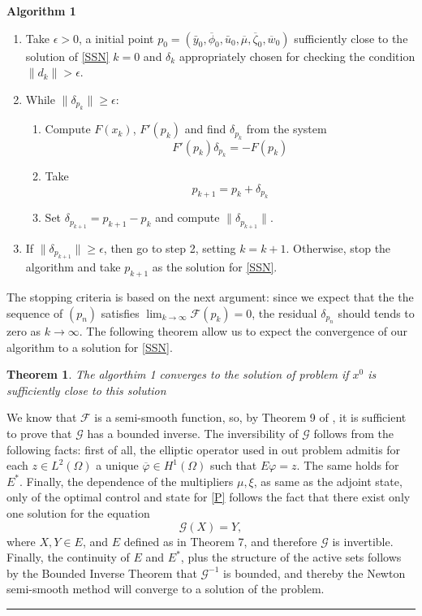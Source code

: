 \documentclass[11pt,a4paper]{amsart}
\newcommand{\kw}{\rule{2mm}{2mm}}
\newcommand{\om}{\Omega}
\renewenvironment{proof}{{Proof.}}{\hfill\kw}
\newtheorem{theorem}{{Theorem}}
\newcommand{\norm}[1]{\lVert #1 \rVert}
\begin{document}
\textbf{Algorithm 1}
\begin{enumerate}
    \item 
    Take $\epsilon>0$, a initial point $p_0=(\bar{y}_0,\overline{\phi}_0,\bar{u}_0,\overline{\mu},\overline{\zeta}_0,\overline{w}_0)$ sufficiently close to the solution of \eqref{SSN} $k=0$ and $\delta_{k}$ appropriately chosen for checking the condition $\norm{d_k}>\epsilon$.    
    \item
       While $\norm{\delta_{p_k}}\ge \epsilon$:
        \begin{enumerate}
            \item 
            Compute $F(x_k)$, $F'(p_k)$ and find $\delta_{p_{k}}$ from the system
            \[
                F'(p_k)\delta_{p_{k}}=-F(p_k)
            \]
            \item
                Take
                \[
                    p_{k+1}=p_k+\delta_{p_k}
                \]
            \item
                Set $\delta_{p_{k+1}}=p_{k+1}-p_{k}$ and compute $\norm{\delta_{p_{k+1}}}$. 
            \end{enumerate}
        \item
        If $\norm{\delta_{p_{k+1}}}\ge \epsilon$, then go to step 2, setting $k=k+1$.  Otherwise, stop the algorithm and take $p_{k+1}$ as the solution for \eqref{SSN}.
\end{enumerate}

The stopping criteria is based on the next argument: since we expect that the the sequence of $(p_n)$ satisfies $\lim_{k\to\infty}\mathcal{F}(p_k)=0$,
the residual $\delta_{p_{n}}$ should tends to zero as $k\to \infty$. The following theorem allow us to expect the convergence of our algorithm to a solution for \eqref{SSN}.

\begin{theorem}
    The algorthim 1 converges to the solution of problem  if $x^0$ is sufficiently close to this solution  
\end{theorem}

\begin{proof}
    We know that $\mathcal{F}$ is a semi-smooth function, so, by Theorem 9 of \cite{stadler}, it is sufficient to prove that $\mathcal{G}$ has a bounded inverse. The inversibility of $\mathcal{G}$ follows from the following facts: first of all, the elliptic operator used in out problem admitis for each $z\in L^2(\om)$ a unique $\overline{\varphi}\in H^1(\om)$ such that $E\varphi=z$. The same holds for $E^*$. Finally, the dependence of the multipliers $\mu, \xi$, as same as the adjoint state, only of the optimal control and state for \eqref{P} follows the fact that there exist only one solution for the equation 
    \[
    \mathcal{G}(X)=Y,
    \]
    where $X,Y\in E$, and $E$ defined as in Theorem 7, and therefore $\mathcal{G}$ is invertible. Finally, the continuity of $E$ and $E^*$, plus the structure of the active sets follows by the Bounded Inverse Theorem that $\mathcal{G}^{-1}$ is bounded, and thereby the Newton semi-smooth method will converge to a solution of the problem.    
\end{proof}
\end{document}
